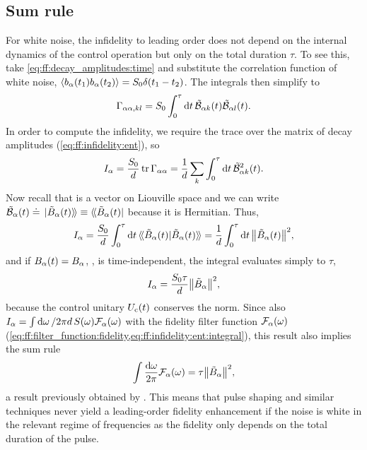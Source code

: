 \subsection{Sum rule}\label{subsec:app:ff:sum_rule}
For white noise, the infidelity to leading order does not depend on the internal dynamics of the control operation but only on the total duration $\tau$.
To see this, take \cref{eq:ff:decay_amplitudes:time} and substitute the correlation function of white noise, $\ev{b_\alpha(t_1)b_\alpha(t_2)}=S_0\delta(t_1-t_2)$.
The integrals then simplify to
\begin{equation}
    \Gamma_{\alpha\alpha,kl} = S_0\int_0^{\tau}\dd{t}\tilde{\mathcal{B}}_{\alpha k}(t)\tilde{\mathcal{B}}_{\alpha l}(t).
\end{equation}
In order to compute the infidelity, we require the trace over the matrix of decay amplitudes (\cref{eq:ff:infidelity:ent}), so
\begin{equation}
    I_{\alpha} = \frac{S_0}{d}\trace\decayamps_{\alpha\alpha} = \frac{1}{d}\sum_k\int_0^{\tau}\dd{t}\ctrlmat_{\alpha k}^2(t).
\end{equation}
Now recall that \ctrlmat is a vector on Liouville space and we can write $\ctrlmat_{\alpha}(t)\doteq\dket*{\Bat(t)}\equiv\dbra*{\Bat(t)}$ because it is Hermitian.
Thus,
\begin{equation}
    I_{\alpha} = \frac{S_0}{d}\int_0^{\tau}\dd{t}\dip*{\Bat(t)}{\Bat(t)} = \frac{1}{d}\int_0^{\tau}\dd{t}\norm{\Bat(t)}^2,
\end{equation}
and if $B_\alpha(t)=B_\alpha$, \ie, is time-independent, the integral evaluates simply to $\tau$,
\begin{equation}
    I_{\alpha} = \frac{S_0\tau}{d}\norm{\tilde{B}_\alpha}^2,
\end{equation}
because the control unitary $U_{\mathrm{c}}(t)$ conserves the norm.
Since also $I_{\alpha}=\int\dd{\omega}/2\pi d\,S(\omega)\mathcal{F}_\alpha(\omega)$ with the fidelity filter function $\mathcal{F}_\alpha(\omega)$ (\cref{eq:ff:filter_function:fidelity,eq:ff:infidelity:ent:integral}), this result also implies the sum rule
\begin{equation}\label{eq:app:ff:sum_rule}
    \int\frac{\dd{\omega}}{2\pi}\mathcal{F}_{\alpha}(\omega) = \tau\norm{\tilde{B}_\alpha}^2,
\end{equation}
a result previously obtained by \textcite{Cywinski2008}.
This means that pulse shaping and similar techniques never yield a leading-order fidelity enhancement if the noise is white in the relevant regime of frequencies as the fidelity only depends on the total duration of the pulse.

